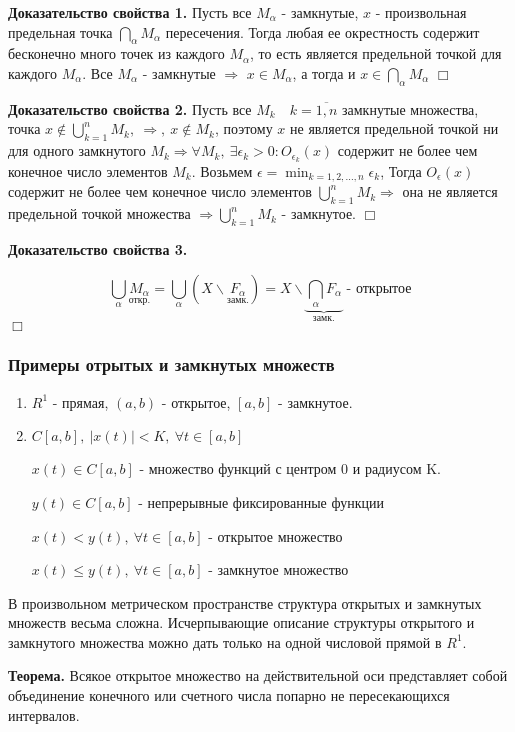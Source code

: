 \documentclass[14pt,a4paper]{extarticle}
\theoremstyle{definition}
\theoremstyle{remark}
\newcommand{\be}{\begin{enumerate}}
\newcommand{\ee}{\end{enumerate}}
\newcommand{\sep}{ , \ \allowbreak }
\renewcommand{\[}{\begin{dmath*}[compact]}
\renewcommand{\]}{\end{dmath*}}
\newcommand{\tth}[1][]{\textbf{Теорема#1.}}
\newcommand{\btev}[1][]{\textbf{Доказательство#1.}
}
\newcommand{\etev}{$\Box$}
\begin{document}
\btev[ свойства 1] Пусть все $M_\alpha$ - замкнутые, $x$ - произвольная
предельная точка $\bigcap _\alpha M_\alpha$ пересечения.
Тогда любая ее окрестность содержит бесконечно много точек из каждого
$M_\alpha$, то есть является предельной точкой для каждого $M_\alpha$.
Все $M_\alpha$ - замкнутые $\Rightarrow$ $x\in M_\alpha$, а тогда и
$x \in \bigcap _\alpha M_\alpha$ \etev

\btev[ свойства 2] Пусть все $M_k \quad k=\overline{1,n}$ замкнутые множества,
точка $x \notin \bigcup _{k = 1}^n M_k \sep \Rightarrow \sep x \notin M_k$,
поэтому $x$ не является предельной точкой ни для одного замкнутого
$M_k \Rightarrow \forall M_k \sep \exists \epsilon_k > 0: O_{\epsilon_k}(x)$
содержит не более чем конечное число элементов $M_k$.
Возьмем $\epsilon = \min_{k=1,2,\dots,n} \epsilon_k$, Тогда $O_\epsilon(x)$
содержит не более чем конечное число элементов
$\bigcup _{k = 1}^n M_k \Rightarrow $ она не является предельной точкой
множества $ \Rightarrow  \bigcup _{k = 1}^n M_k$ - замкнутое. \etev

\btev[ свойства 3]
\[ \bigcup _\alpha \underset{\text{откр.}}{M_\alpha} =
\bigcup _\alpha\left(X\backslash\underset{\text{замк.}}{F_\alpha} \right) =
X\backslash \underbrace{\bigcap _\alpha F_\alpha}_{\text{замк.}}
\text{ - открытое} \]
\etev

\subsubsection{Примеры отрытых и замкнутых множеств}
\be
  \item $R^1$ - прямая, $(a, b)$ - открытое, $[a, b]$ - замкнутое.

  \item $C[a, b]\sep |x(t)| < K \sep \forall t \in [a, b]$

  $x(t) \in C[a, b]$ - множество функций с центром 0 и радиусом K.

  $y(t) \in C[a, b]$ - непрерывные фиксированные функции

  $x(t) < y(t) \sep \forall t \in [a, b]$ - открытое множество

  $x(t) \leq y(t) \sep \forall t \in [a, b]$ - замкнутое множество
\ee

В произвольном метрическом пространстве структура открытых и замкнутых
множеств весьма сложна.
Исчерпывающие описание структуры открытого и замкнутого множества можно дать
только на одной числовой прямой в $R^1$.

\tth[] Всякое открытое множество на действительной оси представляет собой
объединение конечного или счетного числа попарно не пересекающихся интервалов.
\end{document}
